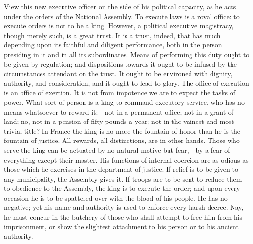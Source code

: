 View this new executive officer on the side of his political capacity, as he acts under the orders of the National Assembly. To execute laws is a royal office; to execute orders is not to be a king. However, a political executive magistracy, though merely such, is a great trust. It is a trust, indeed, that has much depending upon its faithful and diligent performance, both in the person presiding in it and in all its subordinates. Means of performing this duty ought to be given by regulation; and dispositions towards it ought to be infused by the circumstances attendant on the trust. It ought to be environed with dignity, authority, and consideration, and it ought to lead to glory. The office of execution is an office of exertion. It is not from impotence we are to expect the tasks of power. What sort of person is a king to command executory service, who has no means whatsoever to reward it:—not in a permanent office; not in a grant of land; no, not in a pension of fifty pounds a year; not in the vainest and most trivial title? In France the king is no more the fountain of honor than he is the fountain of justice. All rewards, all distinctions, are in other hands. Those who serve the king can be actuated by no natural motive but fear,—by a fear of everything except their master. His functions of internal coercion are as odious as those which he exercises in the department of justice. If relief is to be given to any municipality, the Assembly gives it. If troops are to be sent to reduce them to obedience to the Assembly, the king is to execute the order; and upon every occasion he is to be spattered over with the blood of his people. He has no negative; yet his name and authority is used to enforce every harsh decree. Nay, he must concur in the butchery of those who shall attempt to free him from his imprisonment, or show the slightest attachment to his person or to his ancient authority.

